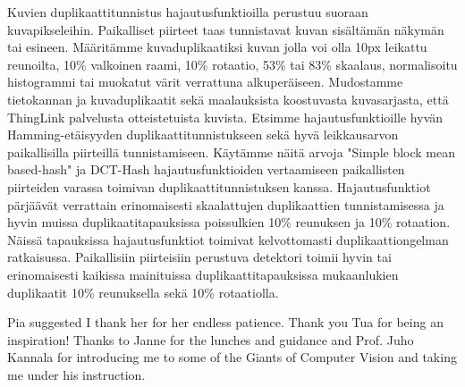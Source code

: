 \documentclass[english,12pt,a4paper,pdftex,elec,utf8]{aaltothesis}
\begin{document}
\newpage
%

\begin{abstractpage}[finnish]
  Kuvien duplikaattitunnistus hajautusfunktioilla perustuu suoraan kuvapikseleihin. Paikalliset piirteet taas tunnistavat kuvan sisältämän näkymän tai esineen. Määritämme kuvaduplikaatiksi kuvan jolla voi olla 10px leikattu reunoilta, 10\% valkoinen raami, 10\% rotaatio, 53\% tai 83\% skaalaus, normalisoitu histogrammi tai muokatut värit verrattuna alkuperäiseen. Mudostamme tietokannan ja kuvaduplikaatit sekä maalauksista koostuvasta kuvasarjasta, että ThingLink palvelusta otteistetuista kuvista. Etsimme hajautusfunktioille hyvän Hamming-etäisyyden duplikaattitunnistukseen sekä hyvä leikkausarvon paikallisilla piirteillä tunnistamiseen. Käytämme näitä arvoja "Simple block mean based-hash" ja DCT-Hash hajautusfunktioiden vertaamiseen paikallisten piirteiden varassa toimivan duplikaattitunnistuksen kanssa. Hajautusfunktiot pärjäävät verrattain erinomaisesti skaalattujen duplikaattien tunnistamisessa ja hyvin muissa duplikaatitapauksissa poissulkien 10\% reunuksen ja 10\% rotaation. Näissä tapauksissa hajautusfunktiot toimivat kelvottomasti duplikaattiongelman ratkaisussa. Paikallisiin piirteisiin perustuva detektori toimii hyvin tai erinomaisesti kaikissa mainituissa duplikaattitapauksissa mukaanlukien duplikaatit 10\% reunuksella sekä 10\% rotaatiolla.
\end{abstractpage}

\newpage

Pia suggested I thank her for her endless patience. Thank you Tua for being an inspiration! Thanks to Janne for the lunches and guidance and Prof. Juho Kannala for introducing me to some of the Giants of Computer Vision and taking me under his instruction.\\
\end{document}
